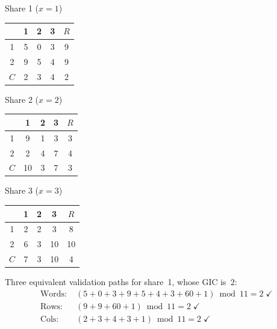 \documentclass[11pt]{article}
\begin{document}
\begin{center}
\small
\begin{minipage}[t]{0.3\linewidth}
\centering
Share 1 ($x=1$)\\[4pt]
\begin{tabular}{@{}c|ccc|c@{}}
\toprule
 & 1 & 2 & 3 & $R$ \\ \midrule
1 & 5 & 0 & 3 & 9 \\
2 & 9 & 5 & 4 & 9 \\ \midrule
$C$ & 2 & 3 & 4 & 2 \\
\bottomrule
\end{tabular}
\end{minipage}%
\hfill
\begin{minipage}[t]{0.3\linewidth}
\centering
Share 2 ($x=2$)\\[4pt]
\begin{tabular}{@{}c|ccc|c@{}}
\toprule
 & 1 & 2 & 3 & $R$ \\ \midrule
1 & 9 & 1 & 3 & 3 \\
2 & 2 & 4 & 7 & 4 \\ \midrule
$C$ & 10 & 3 & 7 & 3 \\
\bottomrule
\end{tabular}
\end{minipage}%
\hfill
\begin{minipage}[t]{0.3\linewidth}
\centering
Share 3 ($x=3$)\\[4pt]
\begin{tabular}{@{}c|ccc|c@{}}
\toprule
 & 1 & 2 & 3 & $R$ \\ \midrule
1 & 2 & 2 & 3 & 8 \\
2 & 6 & 3 & 10 & 10 \\ \midrule
$C$ & 7 & 3 & 10 & 4 \\
\bottomrule
\end{tabular}
\end{minipage}
\end{center}

Three equivalent validation paths for share~1, whose GIC is~$2$:
\begin{align*}
\text{Words:}\; &(5{+}0{+}3{+}9{+}5{+}4{+}3{+}60{+}1) \bmod 11 = 2 \;\checkmark \\
\text{Rows:}\; &(9{+}9{+}60{+}1) \bmod 11 = 2 \;\checkmark \\
\text{Cols:}\; &(2{+}3{+}4{+}3{+}1) \bmod 11 = 2 \;\checkmark
\end{align*}
\end{document}
